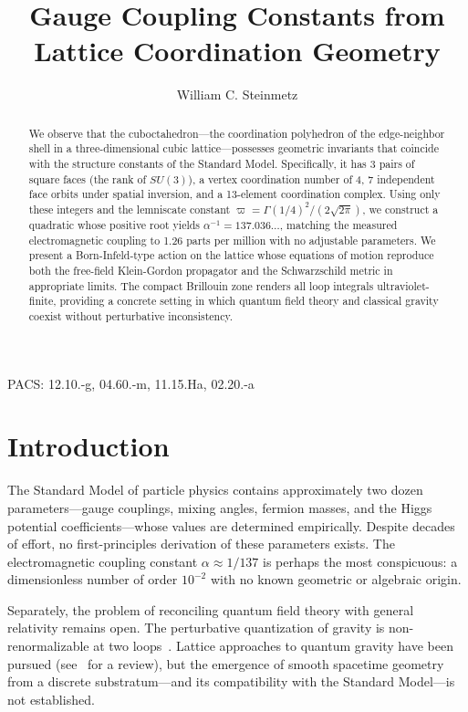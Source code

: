 \documentclass[12pt,a4paper]{article}
\title{\textbf{Gauge Coupling Constants from Lattice Coordination Geometry}}
\author{William C. Steinmetz}
\date{}
\newcommand{\vpi}{\varpi}
\begin{document}
\maketitle

\begin{abstract}
We observe that the cuboctahedron---the coordination polyhedron of the edge-neighbor shell in a three-dimensional cubic lattice---possesses geometric invariants that coincide with the structure constants of the Standard Model. Specifically, it has 3 pairs of square faces (the rank of $SU(3)$), a vertex coordination number of 4, 7 independent face orbits under spatial inversion, and a 13-element coordination complex. Using only these integers and the lemniscate constant $\vpi = \Gamma(1/4)^{2}/(2\sqrt{2\pi})$, we construct a quadratic whose positive root yields $\alpha^{-1} = 137.036\ldots$, matching the measured electromagnetic coupling to 1.26 parts per million with no adjustable parameters. We present a Born-Infeld-type action on the lattice whose equations of motion reproduce both the free-field Klein-Gordon propagator and the Schwarzschild metric in appropriate limits. The compact Brillouin zone renders all loop integrals ultraviolet-finite, providing a concrete setting in which quantum field theory and classical gravity coexist without perturbative inconsistency.
\end{abstract}

\noindent PACS: 12.10.-g, 04.60.-m, 11.15.Ha, 02.20.-a

\section{Introduction}

The Standard Model of particle physics contains approximately two dozen parameters---gauge couplings, mixing angles, fermion masses, and the Higgs potential coefficients---whose values are determined empirically. Despite decades of effort, no first-principles derivation of these parameters exists. The electromagnetic coupling constant $\alpha \approx 1/137$ is perhaps the most conspicuous: a dimensionless number of order $10^{-2}$ with no known geometric or algebraic origin.

Separately, the problem of reconciling quantum field theory with general relativity remains open. The perturbative quantization of gravity is non-renormalizable at two loops~\cite{GoroffSagnotti}. Lattice approaches to quantum gravity have been pursued (see~\cite{Ambjorn} for a review), but the emergence of smooth spacetime geometry from a discrete substratum---and its compatibility with the Standard Model---is not established.
\end{document}
